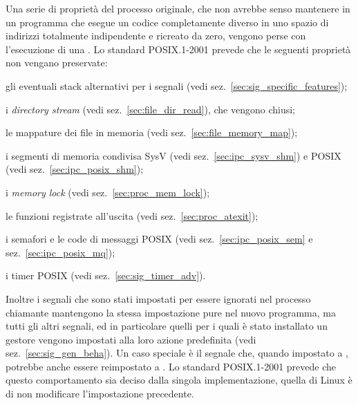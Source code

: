 Una serie di proprietà del processo originale, che non avrebbe senso mantenere
in un programma che esegue un codice completamente diverso in uno spazio di
indirizzi totalmente indipendente e ricreato da zero, vengono perse con
l'esecuzione di una . Lo standard POSIX.1-2001 prevede che le
seguenti proprietà non vengano preservate:
\begin{itemize*}
\item gli eventuali stack alternativi per i segnali (vedi
  sez.~\ref{sec:sig_specific_features});
\item i \textit{directory stream} (vedi sez.~\ref{sec:file_dir_read}), che
  vengono chiusi;
\item le mappature dei file in memoria (vedi sez.~\ref{sec:file_memory_map});
\item i segmenti di memoria condivisa SysV (vedi sez.~\ref{sec:ipc_sysv_shm})
  e POSIX (vedi sez.~\ref{sec:ipc_posix_shm});
\item i \textit{memory lock} (vedi sez.~\ref{sec:proc_mem_lock});
\item le funzioni registrate all'uscita (vedi sez.~\ref{sec:proc_atexit});
\item i semafori e le code di messaggi POSIX (vedi
  sez.~\ref{sec:ipc_posix_sem} e sez.~\ref{sec:ipc_posix_mq});
\item i timer POSIX (vedi sez.~\ref{sec:sig_timer_adv}).
\end{itemize*}

Inoltre i segnali che sono stati impostati per essere ignorati nel processo
chiamante mantengono la stessa impostazione pure nel nuovo programma, ma tutti
gli altri segnali, ed in particolare quelli per i quali è stato installato un
gestore vengono impostati alla loro azione predefinita (vedi
sez.~\ref{sec:sig_gen_beha}). Un caso speciale è il segnale 
che, quando impostato a , potrebbe anche essere reimpostato a
. Lo standard POSIX.1-2001 prevede che questo comportamento
sia deciso dalla singola implementazione, quella di Linux è di non modificare
l'impostazione precedente.

